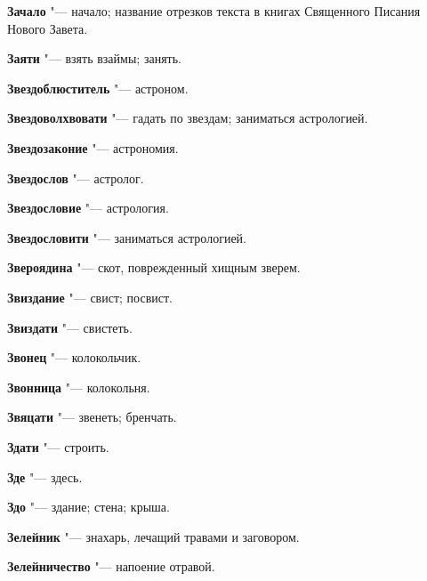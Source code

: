 \begin{mymulticols}{2}
\noindent\textbf{Зачало} "--- начало; название отрезков текста в книгах Священного Писания Нового Завета. 




\noindent\textbf{Заяти} "--- взять взаймы; занять. 




\noindent\textbf{Звездоблюститель} "--- астроном. 




\noindent\textbf{Звездоволхвовати} "--- гадать по звездам; заниматься астрологией. 




\noindent\textbf{Звездозаконие} "--- астрономия. 




\noindent\textbf{Звездослов} "--- астролог. 




\noindent\textbf{Звездословие} "--- астрология. 




\noindent\textbf{Звездословити} "--- заниматься астрологией. 




\noindent\textbf{Звероядина} "--- скот, поврежденный хищным зверем. 




\noindent\textbf{Звиздание} "--- свист; посвист. 




\noindent\textbf{Звиздати} "--- свистеть. 




\noindent\textbf{Звонец} "--- колокольчик. 




\noindent\textbf{Звонница} "--- колокольня. 




\noindent\textbf{Звяцати} "--- звенеть; бренчать. 




\noindent\textbf{Здати} "--- строить. 




\noindent\textbf{Зде} "--- здесь. 




\noindent\textbf{Здо} "--- здание; стена; крыша. 




\noindent\textbf{Зелейник} "--- знахарь, лечащий травами и заговором. 




\noindent\textbf{Зелейничество} "--- напоение отравой. 





\end{mymulticols}

